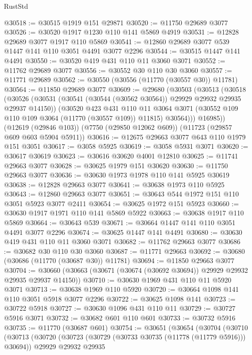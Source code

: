 \begin{lexlean}{RustStd}
\begin{coremodule}
@30518 := @30515 @1919 @151 @29871
@30520 := @11750 @29689 @3077
@30526 := @30520 @1917 @1230 @110 @141 @5869 @4919
@30531 := @12828 @29689 @3077 @1917 @110 @5869
@30541 := @12860 @29689 @3077 @539 @1447 @141 @110 @3051 @4491 @3077 @2296
@30544 := @30515 @1447 @141 @4491
@30550 := @30520 @419 @431 @110 @11 @3060 @3071
@30552 := @11762 @29689 @3077
@30556 := @30552 @30 @110 @30 @3060
@30557 := @11771 @29689
@30562 := @30550 (@30556 (@11770 (@30557 @30)) @11781)
@30564 := @11850 @29689 @3077
@30609 := @29680
    (@30503
      (@30513
        (@30518
          (@30526
            (@30531 (@30541 (@30544 (@30562 @30564)) @29929 @29932 @29935 @29937 @14150))
            (@30520
              @423
              @431
              @110
              @11
              @3064
              @3071
              (@30552 @109 @110 @109 @3064 (@11770 (@30557 @109)) @11815)
              @30564)))
        @16985))
    (@12619 (@29846 @103))
    (@7750 (@29850 @12062 @609))
    (@11723 (@29857 @609 @603 @5904 @5911))
@30616 := @12675 @29663 @3077 @643 @110 @1979 @151 @3051
@30617 := @3058 @5925
@30619 := @3058 @5931 @3071
@30620 := @30617 @30619
@30623 := @30616 @30620 @4001 @12810
@30625 := @11741 @29663 @3077
@30628 := @30625 @1979 @151 @30620
@30630 := @11750 @29663 @3077
@30636 := @30630 @1973 @1978 @110 @141 @5925 @30619
@30638 := @12828 @29663 @3077
@30641 := @30638 @1973 @110 @5925
@30643 := @12860 @29663 @3077
@30651 := @30643 @544 @1972 @151 @110 @3051 @5923 @3077 @2411
@30654 := @30625 @1972 @151 @5923
@30660 := @30630 @1917 @1971 @110 @141 @5869 @5922
@30663 := @30638 @1917 @110 @5869
@30664 := @30643 @539
@30671 := @30664 @1447 @141 @110 @3051 @4491 @3077 @2296
@30674 := @30625 @1447 @141 @4491
@30680 := @30630 @419 @431 @110 @11 @3060 @3071
@30682 := @11762 @29663 @3077
@30686 := @30682 @30 @110 @30 @3060
@30687 := @11771 @29663
@30692 := @30680 (@30686 (@11770 (@30687 @30)) @11781)
@30694 := @11850 @29663 @3077
@30704 := @30660 (@30663 (@30671 (@30674 (@30692 @30694)) @29929 @29932 @29935 @29937 @14150))
@30710 := @30630 @1969 @431 @110 @11 @5920 @3071
@30713 := @30638 @1969 @110 @5920
@30720 := @30664 @1098 @141 @110 @3051 @5918 @3077 @2296
@30722 := @30625 @1098 @141
@30723 := @30722 @5918
@30727 := @30630 @1096 @431 @110 @11
@30729 := @30727 @5916 @3071
@30732 := @30682 @601 @110 @601
@30733 := @30732 @5916
@30735 := @11770 (@30687 @601)
@30754 := @30651
    (@30654
      (@30704
        (@30710
          (@30713
            (@30720
              (@30723 (@30729 (@30733 @30735 (@11778 (@11779 @5916))) @30694))
              @29929
              @29932
              @29935

\end{coremodule}
\end{lexlean}
